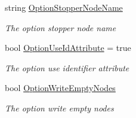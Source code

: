 \begin{DoxyCompactItemize}
string \hyperlink{class_html_agility_pack_1_1_html_document_a4cd3a7d5ba8013d8b1e2a723a8ac3b5a}{Option\+Stopper\+Node\+Name}
\begin{DoxyCompactList}\small\item\em The option stopper node name \end{DoxyCompactList}\item 
bool \hyperlink{class_html_agility_pack_1_1_html_document_a945f9e80ce08a273410efe0b650292ad}{Option\+Use\+Id\+Attribute} = true
\begin{DoxyCompactList}\small\item\em The option use identifier attribute \end{DoxyCompactList}\item 
bool \hyperlink{class_html_agility_pack_1_1_html_document_a5abfcd8220e667a26ce3861b09adf39e}{Option\+Write\+Empty\+Nodes}
\begin{DoxyCompactList}\small\item\em The option write empty nodes \end{DoxyCompactList}\end{DoxyCompactItemize}
